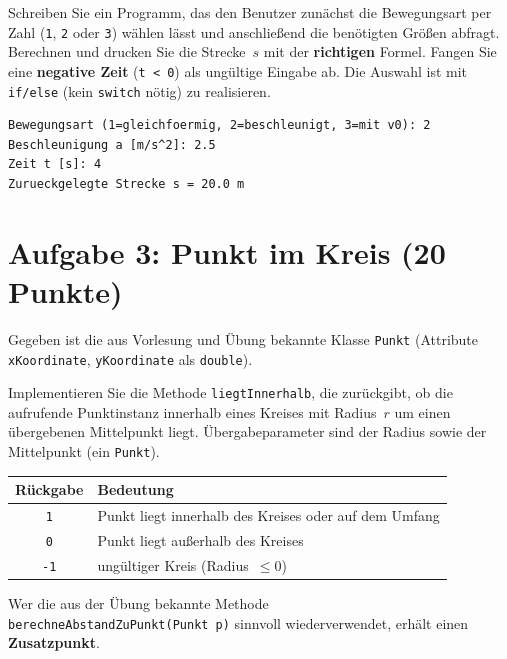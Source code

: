 \documentclass[
	fontsize=12pt,
	paper=a4,
	numbers=noenddot,
	parskip=half,
	openany
]{scrbook}
\begin{document}
Schreiben Sie ein Programm, das den Benutzer zunächst die Bewegungsart per Zahl (\texttt{1}, \texttt{2} oder \texttt{3}) wählen lässt und anschließend die benötigten Größen abfragt.
Berechnen und drucken Sie die Strecke~$s$ mit der \textbf{richtigen} Formel. Fangen Sie eine \textbf{negative Zeit} (\texttt{t < 0}) als ungültige Eingabe ab.
Die Auswahl ist mit \texttt{if/else} (kein \texttt{switch} nötig) zu realisieren.

\begin{beispiel}[Beispieldialog]
\begin{lstlisting}[language={}]
Bewegungsart (1=gleichfoermig, 2=beschleunigt, 3=mit v0): 2
Beschleunigung a [m/s^2]: 2.5
Zeit t [s]: 4
Zurueckgelegte Strecke s = 20.0 m
\end{lstlisting}
\end{beispiel}

\clearpage
\section*{Aufgabe 3: Punkt im Kreis \hfill (20 Punkte)}

Gegeben ist die aus Vorlesung und Übung bekannte Klasse \texttt{Punkt} (Attribute \texttt{xKoordinate}, \texttt{yKoordinate} als \texttt{double}).

Implementieren Sie die Methode \texttt{liegtInnerhalb}, die zurückgibt, ob die aufrufende Punktinstanz innerhalb eines Kreises mit Radius~$r$ um einen übergebenen Mittelpunkt liegt.
Übergabeparameter sind der Radius sowie der Mittelpunkt (ein \texttt{Punkt}).

\begin{center}
\begin{tabular}{c l}
	\toprule
	\textbf{Rückgabe} & \textbf{Bedeutung} \\
	\midrule
	\texttt{1}  & Punkt liegt innerhalb des Kreises oder auf dem Umfang \\
	\texttt{0}  & Punkt liegt außerhalb des Kreises \\
	\texttt{-1} & ungültiger Kreis (Radius~$\le 0$) \\
	\bottomrule
\end{tabular}
\end{center}

\begin{hinweis}[Wiederverwendung]
	Wer die aus der Übung bekannte Methode\\ \texttt{berechneAbstandZuPunkt(Punkt p)} sinnvoll wiederverwendet, erhält einen \textbf{Zusatzpunkt}.
\end{hinweis}
\end{document}

